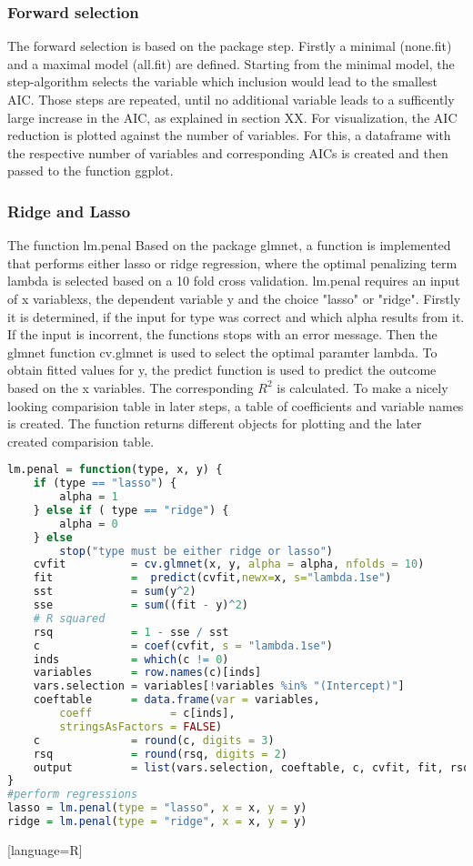 \subsubsection{Forward selection}
The forward selection is based on the package step. Firstly a minimal (none.fit) and a maximal model (all.fit) are defined. Starting from the minimal model, the step-algorithm selects the variable which inclusion would lead to the smallest AIC. Those steps are repeated, until no additional variable leads to a sufficently large increase in the AIC, as explained in section XX. 
For visualization, the AIC reduction is plotted against the number of variables. For this, a dataframe with the respective number of variables and corresponding AICs is created and then passed to the function ggplot.


\subsubsection{Ridge and Lasso}
The function lm.penal Based on the package glmnet, a function is implemented  that performs either lasso or ridge regression, where the optimal penalizing term lambda is selected based on a 10 fold cross validation. lm.penal requires an input of x variablexs, the dependent variable y and the choice "lasso" or "ridge". Firstly it is determined, if the input for type was correct and which alpha results from it. If the input is incorrent, the functions stops with an error message.
Then the glmnet function cv.glmnet is used to select the optimal paramter lambda. To obtain fitted values for y,  the predict function is used  to predict the outcome based on the x variables. The corresponding $R^{2}$ is calculated.
To make a nicely looking comparision table in later steps, a table of coefficients and variable names is created. The function returns different objects for plotting and the later created comparision table.
\begin{lstlisting}[language=R]
lm.penal = function(type, x, y) {
    if (type == "lasso") {
        alpha = 1
    } else if ( type == "ridge") {
        alpha = 0
    } else
        stop("type must be either ridge or lasso")
    cvfit          = cv.glmnet(x, y, alpha = alpha, nfolds = 10)
    fit            =  predict(cvfit,newx=x, s="lambda.1se")
    sst            = sum(y^2)
    sse            = sum((fit - y)^2)
    # R squared
    rsq            = 1 - sse / sst
    c              = coef(cvfit, s = "lambda.1se")
    inds           = which(c != 0)
    variables      = row.names(c)[inds]
    vars.selection = variables[!variables %in% "(Intercept)"]
    coeftable      = data.frame(var = variables,
        coeff            = c[inds],
        stringsAsFactors = FALSE)
    c              = round(c, digits = 3)
    rsq            = round(rsq, digits = 2)
    output         = list(vars.selection, coeftable, c, cvfit, fit, rsq)
}
#perform regressions
lasso = lm.penal(type = "lasso", x = x, y = y)
ridge = lm.penal(type = "ridge", x = x, y = y)
\end{lstlisting}[language=R]

